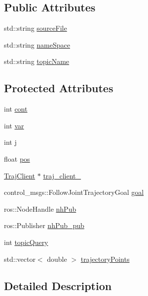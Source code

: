 \subsection*{Public Attributes}
\begin{DoxyCompactItemize}
\item 
std\+::string \hyperlink{class_re_con_bot_a65cf4bed9bbabd92e1265d05507e0945}{source\+File}
\item 
std\+::string \hyperlink{class_re_con_bot_a40ca07cd606988b78664c4a52fd8dc59}{name\+Space}
\item 
std\+::string \hyperlink{class_re_con_bot_a1d91d2ea8c0f16340440357906fb9ebf}{topic\+Name}
\end{DoxyCompactItemize}
\subsection*{Protected Attributes}
\begin{DoxyCompactItemize}
\item 
int \hyperlink{class_re_con_bot_pub_a2b0249f374eb7a6ab7741a85d8ebd9d5}{cont}
\item 
int \hyperlink{class_re_con_bot_pub_ac2d5ba45905a24cfbdd78bce2dfe2a4f}{var}
\item 
int \hyperlink{class_re_con_bot_pub_a1d9d82f366eeb794ffa28630de286710}{j}
\item 
float \hyperlink{class_re_con_bot_pub_a51311eed78ce3a444b35924c64ad3f4c}{pos}
\item 
\hyperlink{basic__arm_8cpp_a6fb8875093261cdc69e54d3ac7d5c301}{Traj\+Client} $\ast$ \hyperlink{class_re_con_bot_a14a35ad6ca284af7db7228d7872720d1}{traj\+\_\+client\+\_\+}
\item 
control\+\_\+msgs\+::\+Follow\+Joint\+Trajectory\+Goal \hyperlink{class_re_con_bot_a9bd1c7ddf2376e2e68ea5d8bd8c3f505}{goal}
\item 
ros\+::\+Node\+Handle \hyperlink{class_re_con_bot_a37edfe9c2dbbf37894c9bf850806fdd3}{nh\+Pub}
\item 
ros\+::\+Publisher \hyperlink{class_re_con_bot_a549b7542d286b690f38b7ece8b83850b}{nh\+Pub\+\_\+pub}
\item 
int \hyperlink{class_re_con_bot_aba20d307ac1b2e6b22f96da83a0d937d}{topic\+Query}
\item 
std\+::vector$<$ double $>$ \hyperlink{class_re_con_bot_a7c59e136741800bf0734f659119aa5ee}{trajectory\+Points}
\end{DoxyCompactItemize}


\subsection{Detailed Description}



